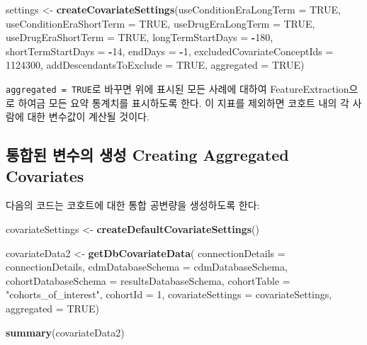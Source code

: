 \documentclass[10.5pt]{book}
\newenvironment{Shaded}{\begin{snugshade}}{\end{snugshade}}
\newcommand{\KeywordTok}[1]{\textcolor[rgb]{0.13,0.29,0.53}{\textbf{#1}}}
\newcommand{\DataTypeTok}[1]{\textcolor[rgb]{0.13,0.29,0.53}{#1}}
\newcommand{\DecValTok}[1]{\textcolor[rgb]{0.00,0.00,0.81}{#1}}
\newcommand{\StringTok}[1]{\textcolor[rgb]{0.31,0.60,0.02}{#1}}
\newcommand{\OtherTok}[1]{\textcolor[rgb]{0.56,0.35,0.01}{#1}}
\newcommand{\OperatorTok}[1]{\textcolor[rgb]{0.81,0.36,0.00}{\textbf{#1}}}
\newcommand{\NormalTok}[1]{#1}
\theoremstyle{definition}
\theoremstyle{definition}
\theoremstyle{definition}
\theoremstyle{remark}
\let\BeginKnitrBlock\begin \let\EndKnitrBlock\end
\begin{document}
\begin{Shaded}
\begin{Highlighting}[]
\NormalTok{settings <-}\StringTok{ }\KeywordTok{createCovariateSettings}\NormalTok{(}\DataTypeTok{useConditionEraLongTerm =} \OtherTok{TRUE}\NormalTok{,}
                                    \DataTypeTok{useConditionEraShortTerm =} \OtherTok{TRUE}\NormalTok{,}
                                    \DataTypeTok{useDrugEraLongTerm =} \OtherTok{TRUE}\NormalTok{,}
                                    \DataTypeTok{useDrugEraShortTerm =} \OtherTok{TRUE}\NormalTok{,}
                                    \DataTypeTok{longTermStartDays =} \OperatorTok{-}\DecValTok{180}\NormalTok{,}
                                    \DataTypeTok{shortTermStartDays =} \OperatorTok{-}\DecValTok{14}\NormalTok{,}
                                    \DataTypeTok{endDays =} \OperatorTok{-}\DecValTok{1}\NormalTok{,}
                                    \DataTypeTok{excludedCovariateConceptIds =} \DecValTok{1124300}\NormalTok{,}
                                    \DataTypeTok{addDescendantsToExclude =} \OtherTok{TRUE}\NormalTok{,}
                                    \DataTypeTok{aggregated =} \OtherTok{TRUE}\NormalTok{)}
\end{Highlighting}
\end{Shaded}

\BeginKnitrBlock{rmdimportant}
\texttt{aggregated\ =\ TRUE}로 바꾸면 위에 표시된 모든 사례에 대하여
FeatureExtraction으로 하여금 모든 요약 통계치를 표시하도록 한다. 이
지표를 제외하면 코호트 내의 각 사람에 대한 변수값이 계산될 것이다.
\EndKnitrBlock{rmdimportant}

\subsection{통합된 변수의 생성 Creating Aggregated
Covariates}\label{---creating-aggregated-covariates}

다음의 코드는 코호트에 대한 통합 공변량을 생성하도록 한다:

\begin{Shaded}
\begin{Highlighting}[]
\NormalTok{covariateSettings <-}\StringTok{ }\KeywordTok{createDefaultCovariateSettings}\NormalTok{()}

\NormalTok{covariateData2 <-}\StringTok{ }\KeywordTok{getDbCovariateData}\NormalTok{(}
  \DataTypeTok{connectionDetails =}\NormalTok{ connectionDetails,}
  \DataTypeTok{cdmDatabaseSchema =}\NormalTok{ cdmDatabaseSchema,}
  \DataTypeTok{cohortDatabaseSchema =}\NormalTok{ resultsDatabaseSchema,}
  \DataTypeTok{cohortTable =} \StringTok{"cohorts_of_interest"}\NormalTok{,}
  \DataTypeTok{cohortId =} \DecValTok{1}\NormalTok{,}
  \DataTypeTok{covariateSettings =}\NormalTok{ covariateSettings,}
  \DataTypeTok{aggregated =} \OtherTok{TRUE}\NormalTok{)}

\KeywordTok{summary}\NormalTok{(covariateData2)}
\end{Highlighting}
\end{Shaded}
\end{document}
